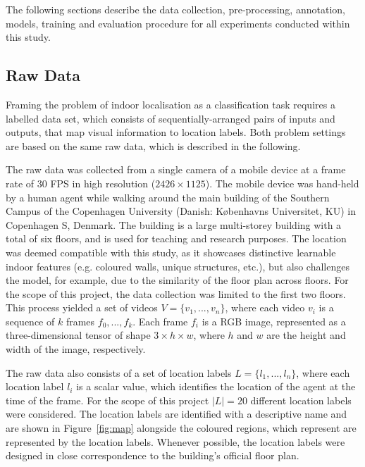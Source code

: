 \documentclass[a4paper]{article}
\begin{document}

The following sections describe the data collection, pre-processing,
annotation, models, training and evaluation procedure for all experiments
conducted within this study.

\subsection{Raw Data} %
\label{sub:raw-data}

Framing the problem of indoor localisation as a classification task requires a
labelled data set, which consists of sequentially-arranged pairs of inputs and
outputs, that map visual information to location labels. Both problem settings
are based on the same raw data, which is described in the following.

The raw data was collected from a single camera of a mobile device at a frame
rate of 30 FPS in high resolution ($2426\times 1125$). The mobile device was
hand-held by a human agent while walking around the main building of the
Southern Campus of the Copenhagen University (Danish: K\o{}benhavns
Universitet, KU) in Copenhagen S, Denmark. The building is a large
multi-storey building with a total of six floors, and is used for teaching and
research purposes. The location was deemed compatible with this study, as it
showcases distinctive learnable indoor features (e.g. coloured walls, unique
structures, etc.), but also challenges the model, for example, due to the
similarity of the floor plan across floors. For the scope of this project, the
data collection was limited to the first two floors. This process yielded a
set of videos $V = \{v_1, ..., v_n\}$, where each video $v_i$ is a sequence of
$k$ frames $f_0, ..., f_k$. Each frame $f_i$ is a RGB image, represented as a
three-dimensional tensor of shape $3 \times h \times w$, where $h$ and $w$ are
the height and width of the image, respectively. 

The raw data also consists of a set of location labels $L = \{l_1, ...,
l_n\}$, where each location label $l_i$ is a scalar value, which identifies
the location of the agent at the time of the frame. For the scope of this
project $|L|=20$ different location labels were considered. The location
labels are identified with a descriptive name and are shown in
Figure~\ref{fig:map} alongside the coloured regions, which represent are
represented by the location labels. Whenever possible, the location labels
were designed in close correspondence to the building's official floor plan.
\end{document}
